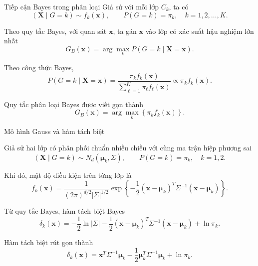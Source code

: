\documentclass{beamer}
\def\bsx{\bm{x}}
\def\bsX{\bm{X}}
\begin{document}
\begin{frame}{Tiếp cận Bayes trong phân loại}
	Giả sử với mỗi lớp \(C_k\), ta có
	\begin{equation}
		(\bsX\mid G=k) \sim f_k(\bsx),
		\qquad 
		P(G=k)=\pi_k,
		\quad k=1,2,\ldots,K.
		\tag{10}
	\end{equation}
	
	Theo quy tắc Bayes, với quan sát \(\bsx\), ta gán \(\bsx\) vào lớp có xác suất hậu nghiệm lớn nhất
	\begin{equation}
		G_B(\bsx)
		=
		\arg\max_{k}
		P(G=k\mid \bsX=\bsx).
		\tag{11}
	\end{equation}
	
	Theo công thức Bayes,
	\begin{equation}
		P(G=k\mid \bsX=\bsx)
		=
		\frac{\pi_k f_k(\bsx)}
		{\sum_{\ell=1}^{K}\pi_\ell f_\ell(\bsx)}
		\propto
		\pi_k f_k(\bsx).
		\tag{12}
	\end{equation}
	
	Quy tắc phân loại Bayes được viết gọn thành
	\begin{equation}
		G_B(\bsx)
		=
		\arg\max_{k}
		\left\{
		\pi_k f_k(\bsx)
		\right\}.
		\tag{13}
	\end{equation}
\end{frame}

\begin{frame}{Mô hình Gauss và hàm tách biệt}
	\small
	
	Giả sử hai lớp có phân phối chuẩn nhiều chiều với cùng ma trận hiệp phương sai
	\begin{equation}
		(\mathbf{X}\mid G=k)
		\sim
		N_d(\bm{\mu}_k,\Sigma),
		\qquad
		P(G=k)=\pi_k,
		\quad k=1,2.
		\tag{14}
	\end{equation}
	
	Khi đó, mật độ điều kiện trên từng lớp là
	\begin{equation}
		f_k(\bsx)
		=
		\frac{1}{(2\pi)^{d/2}|\Sigma|^{1/2}}
		\exp
		\left\{
		-\frac{1}{2}
		(\bsx-\bm{\mu}_k)^T
		\Sigma^{-1}
		(\bsx-\bm{\mu}_k)
		\right\}.
		\tag{15}
	\end{equation}
	
	Từ quy tắc Bayes, hàm tách biệt Bayes
	\begin{equation}
		\delta_k(\bsx)
		=
		-\frac{1}{2}\ln|\Sigma|
		-\frac{1}{2}
		(\bsx-\bm{\mu}_k)^T
		\Sigma^{-1}
		(\bsx-\bm{\mu}_k)
		+\ln\pi_k.
		\tag{16}
	\end{equation}
	
	Hàm tách biệt rút gọn thành
	\begin{equation}
		\delta_k(\bsx)
		=
		\bsx^T\Sigma^{-1}\bm{\mu}_k
		-
		\frac{1}{2}
		\bm{\mu}_k^T\Sigma^{-1}\bm{\mu}_k
		+
		\ln\pi_k.
		\tag{17}
	\end{equation}
\end{frame}
\end{document}
